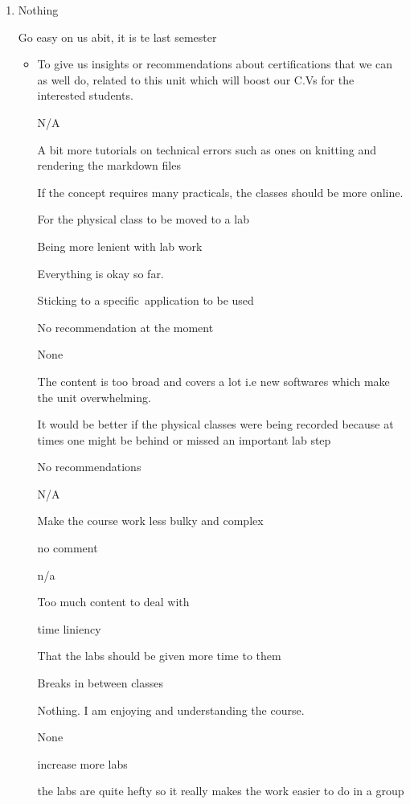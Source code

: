 \documentclass[
]{article}
\providecommand{\tightlist}{%
  \setlength{\itemsep}{0pt}\setlength{\parskip}{0pt}}
\begin{document}
\begin{enumerate}
\def\labelenumi{\arabic{enumi}.}
\tightlist
\item
  Nothing

  Go easy on us abit, it is te last semester

  \begin{itemize}
  \tightlist
  \item
    To give us insights or recommendations about certifications that we
    can as well do, related to this unit which will boost our C.Vs for
    the interested students.~

    N/A

    A bit more tutorials on technical errors such as ones on knitting
    and rendering the markdown files

    If the concept requires many practicals, the classes should be more
    online.

    For the physical class to be moved to a lab

    Being more lenient with lab work

    Everything is okay so far.

    Sticking to a specific~application to be used

    No recommendation at the moment

    None

    The content is too broad and covers a lot i.e new softwares which
    make the unit overwhelming.

    It would be better if the physical classes were being recorded
    because at times one might be behind or missed an important lab step
    ~

    No recommendations

    N/A

    Make the course work less bulky and complex

    no comment

    n/a

    Too much content to deal with

    time liniency

    That the labs should be given more time to them~

    Breaks in between classes

    Nothing. I am enjoying and understanding the course.

    None~

    increase more labs

    the labs are quite hefty so it really makes the work easier to do in
    a group


\end{itemize}
\end{enumerate}
\end{document}
